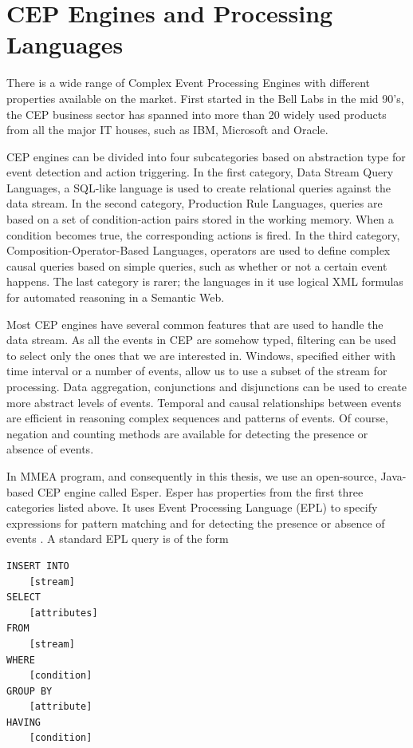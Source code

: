 \section{CEP Engines and Processing Languages}
There is a wide range of Complex Event Processing Engines with different properties available on the market. First started in the Bell Labs in the mid 90's, the CEP business sector has spanned into more than 20 widely used products from all the major IT houses, such as IBM, Microsoft and Oracle. \cite{Vincent11}  

CEP engines can be divided into four subcategories based on abstraction type for event detection and action triggering. In the first category, Data Stream Query Languages, a SQL-like language is used to create relational queries against the data stream. In the second category, Production Rule Languages, queries are based on a set of condition-action pairs stored in the working memory. When a condition becomes true, the corresponding actions is fired. In the third category, Composition-Operator-Based Languages, operators are used to define complex causal queries based on simple queries, such as whether or not a certain event happens. The last category is rarer; the languages in it use logical XML formulas for automated reasoning in a Semantic Web. \cite{Bui08}

Most CEP engines have several common features that are used to handle the data stream. As all the events in CEP are somehow typed, filtering can be used to select only the ones that we are interested in. Windows, specified either with time interval or a number of events, allow us to use a subset of the stream for processing. Data aggregation, conjunctions and disjunctions can be used to create more abstract levels of events. Temporal and causal relationships between events are efficient in reasoning complex sequences and patterns of events. Of course, negation and counting methods are available for detecting the presence or absence of events. \cite{Marcelo09}

In MMEA program, and consequently in this thesis, we use an open-source, Java-based CEP engine called Esper. Esper has properties from the first three categories listed above. It uses Event Processing Language (EPL) to specify expressions for pattern matching and for detecting the presence or absence of events \cite{EsperReference}. A standard EPL query is of the form

\begin{Verbatim}[xleftmargin=1.5em]
INSERT INTO
	[stream]
SELECT
	[attributes]
FROM
	[stream]
WHERE
	[condition]
GROUP BY
	[attribute]
HAVING
	[condition]
\end{Verbatim}

